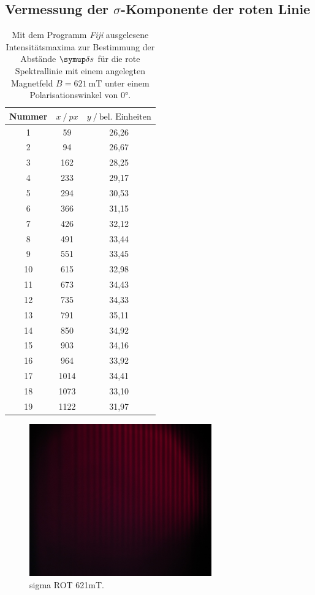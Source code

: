 \subsection{Vermessung der \texorpdfstring{$\sigma$}{sigma}-Komponente der roten Linie}

\begin{table}[H]
  \centering
  \caption{Mit dem Programm \textit{Fiji} \cite{Fiji} ausgelesene Intensitätsmaxima zur Bestimmung der Abstände $\deltaup s$ für die rote Spektrallinie mit einem angelegten Magnetfeld $B=\SI{621}{\milli\tesla}$  unter einem Polarisationswinkel von $0°$.}
  \label{tab:277-Max}
  \begin{tabular}{c|cc}
    \toprule
    {Nummer} & {$x \:/\: \si{px}$} & {$y \:/\: \text{bel. Einheiten}$}\\
    \midrule
 1 &   59  &	 26,26 \\
 2 &   94  &	 26,67 \\
 3 &  162  &	 28,25 \\
 4 &  233  &	 29,17 \\
 5 &  294  &	 30,53 \\
 6 &  366  &	 31,15 \\
 7 &  426  &	 32,12 \\
 8 &  491  &	 33,44 \\
 9 &  551  &  33,45 \\
10 &  615  &	 32,98 \\
11 &  673  &	 34,43 \\
12 &  735  &	 34,33 \\
13 &  791  &	 35,11 \\
14 &  850  &	 34,92 \\
15 &  903  &	 34,16 \\
16 &  964  &	 33,92 \\
17 & 1014  &	 34,41 \\
18 & 1073  &	 33,10 \\
19 & 1122  &	 31,97 \\
  \end{tabular}
\end{table}
\begin{figure}
  \centering
  \includegraphics[width=0.7\textwidth]{bilder/2995_ROT_621mT_sigma.jpg}
  \caption{sigma ROT 621mT.}
  \label{abb:sigmarot621mT}
\end{figure}
